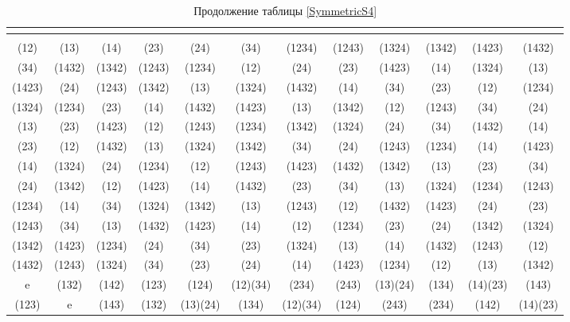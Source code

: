 \documentclass[11pt]{book}
\theoremstyle{mythm}
\theoremstyle{mydef}
\numberwithin{upr}{chapter}
\begin{document}
\newpage
\begin{table}[h!]\tiny\sffamily
\caption{Продолжение таблицы \ref{SymmetricS4}}
\begin{tabular}{cccccccccccc}
\hline
\multicolumn{12}{c}{} \\ \hline
\multicolumn{12}{c}{} \\ \hline
\cellcolor{yellow}(12) & (13) & (14) & (23) & (24) &\cellcolor{yellow} (34) & (1234) & (1243) &\cellcolor{yellow} (1324) & (1342) &\cellcolor{yellow} (1423) & (1432) \\ \hline
\cellcolor{yellow}(34) & (1432) & (1342) & (1243) & (1234) &\cellcolor{yellow} (12) & (24) & (23) &\cellcolor{yellow} (1423) & (14) &\cellcolor{yellow} (1324) & (13) \\ \hline
\cellcolor{yellow}(1423) & (24) & (1243) & (1342) & (13) &\cellcolor{yellow} (1324) & (1432) & (14) &\cellcolor{yellow} (34) & (23) &\cellcolor{yellow} (12) & (1234) \\ \hline
\cellcolor{yellow}(1324) & (1234) & (23) & (14) & (1432) &\cellcolor{yellow} (1423) & (13) & (1342) &\cellcolor{yellow} (12) & (1243) &\cellcolor{yellow} (34) & (24) \\ \hline
(13) & (23) & (1423) & (12) & (1243) & (1234) & (1342) & (1324) & (24) & (34) & (1432) & (14) \\ \hline
(23) & (12) & (1432) & (13) & (1324) & (1342) & (34) & (24) & (1243) & (1234) & (14) & (1423) \\ \hline
(14) & (1324) & (24) & (1234) & (12) & (1243) & (1423) & (1432) & (1342) & (13) & (23) & (34) \\ \hline
(24) & (1342) & (12) & (1423) & (14) & (1432) & (23) & (34) & (13) & (1324) & (1234) & (1243) \\ \hline
(1234) & (14) & (34) & (1324) & (1342) & (13) & (1243) & (12) & (1432) & (1423) & (24) & (23) \\ \hline
(1243) & (34) & (13) & (1432) & (1423) & (14) & (12) & (1234) & (23) & (24) & (1342) & (1324) \\ \hline
(1342) & (1423) & (1234) & (24) & (34) & (23) & (1324) & (13) & (14) & (1432) & (1243) & (12) \\ \hline
(1432) & (1243) & (1324) & (34) & (23) & (24) & (14) & (1423) & (1234) & (12) & (13) & (1342) \\ \hline
\cellcolor{yellow}e & (132) & (142) & (123) & (124) &\cellcolor{yellow} (12)(34) & (234) & (243) &\cellcolor{yellow} (13)(24) & (134) &\cellcolor{yellow} (14)(23) & (143) \\ \hline
(123) & e & (143) & (132) & (13)(24) & (134) & (12)(34) & (124) & (243) & (234) & (142) & (14)(23) \\ \hline

\end{tabular}
\end{table}
\end{document}

